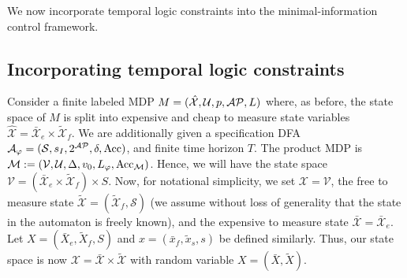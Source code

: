 We now incorporate temporal logic constraints into the minimal-information control framework.
\subsection{Incorporating temporal logic constraints}
Consider a finite labeled MDP $M=(\mathcal{\hat{X}},\mathcal{U},p,\mathcal{AP},L)$ where, as before, the state space of $M$ is split into expensive and cheap to measure state variables $\mathcal{\hat{X}} = \mathcal{\bar{X}}_e \times \mathcal{\tilde{X}}_f$. We are additionally given a specification DFA $\mathcal{A}_{\varphi} = (\mathcal{S},s_I,2^{\mathcal{AP}}, \delta,\textrm{Acc})$, and finite time horizon $T$. The product MDP is $\mathcal{M}:= (\mathcal{V},\mathcal{U}, \Delta,v_0,L_{\varphi},\textrm{Acc}_{\mathcal{M}})$.  Hence, we will have the state space $\mathcal{V} = (\mathcal{\bar{X}}_e \times \mathcal{\tilde{X}}_f) \times S$. Now, for notational simplicity, we set $\mathcal{X} = \mathcal{V}$, the free to measure state $\mathcal{\tilde{X}} = (\mathcal{\tilde{X}}_f,\mathcal{S})$ (we assume without loss of generality that the state in the automaton is freely known), and the expensive to measure state $\mathcal{\bar{X}} = \mathcal{\bar{X}}_e$. Let $X = (\bar{X}_e,\tilde{X}_f,S)$ and $x = (\bar{x}_f,\tilde{x}_s,s)$ be defined similarly. Thus, our state space is now $\mathcal{X}= \mathcal{\bar{X}} \times \mathcal{\tilde{X}}$ with random variable $X = (\bar{X},\tilde{X})$. 

